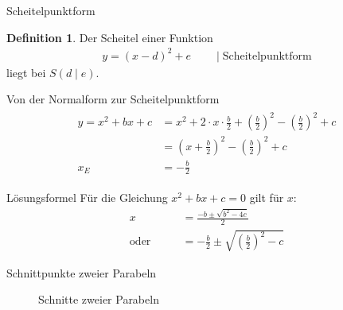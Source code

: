 \documentclass[10pt,aspectratio=169]{beamer}
\newcommand{\x}{\cdot}
\theoremstyle{definition}
\theoremstyle{definition}
\newtheorem{defi}{Definition}[section]
\theoremstyle{definition}
\theoremstyle{definition}
\theoremstyle{remark}
\theoremstyle{definition}
\begin{document}
\begin{frame}{Scheitelpunktform}
    \begin{defi}
    Der Scheitel einer Funktion \begin{align}
        y = (x-d)^2+e \qquad \mid \text{Scheitelpunktform}
    \end{align} liegt bei $S(d\mid e)$.
    \end{defi}
\end{frame}
\begin{frame}{Von der Normalform zur Scheitelpunktform}
    \begin{align}
    \begin{aligned}
    y = x^2+bx+c &= x^2+ 2\x x \x \frac{b}{2} + \left( \frac{b}{2} \right)^2- \left( \frac{b}{2} \right)^2+c\\ 
    &= \left( x+\frac{b}{2} \right)^2-\left( \frac{b}{2} \right)^2+c \\
    x_E &= -\frac{b}{2}
    \end{aligned}
    \end{align}
\end{frame}
\begin{frame}{Lösungsformel}
    Für die Gleichung $x^2+bx+c=0$ gilt für $x$:
    \begin{align}
        x&=\frac{-b\pm \sqrt{b^2-4c}}{2} \\
        \text{oder} \qquad &= -\frac{b}{2} \pm \sqrt{\left(\frac{b}{2} \right)^2-c}
    \end{align}
\end{frame}
\begin{frame}{Schnittpunkte zweier Parabeln}
\begin{figure}
    \centering
    \caption{Schnitte zweier Parabeln}
    \label{fig:schnitt}
\end{figure}
\end{frame}
\end{document}
